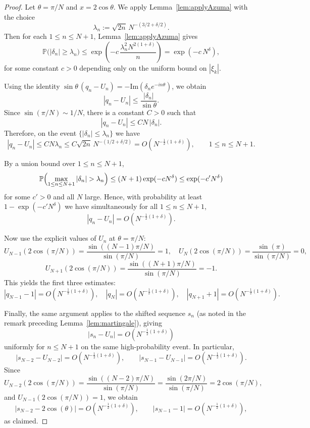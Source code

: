 \documentclass{amsart}
\theoremstyle{remark}
\theoremstyle{definition}
\begin{document}
\begin{proof}
Let $\theta=\pi/N$ and $x=2\cos\theta$.  We apply Lemma~\ref{lem:applyAzuma} with the choice
\[
\lambda_n := \sqrt{2n}\,N^{-(3/2+\delta/2)} .
\]
Then for each $1\le n\le N+1$, Lemma~\ref{lem:applyAzuma} gives
\[
\mathbb{P}\bigl(|\delta_n|\ge \lambda_n\bigr)
\le
\exp\!\left(-c\,\frac{\lambda_n^2 N^{2(1+\delta)}}{n}\right)
=
\exp\!\left(-c\,N^{\delta}\right),
\]
for some constant $c>0$ depending only on the uniform bound on $|\xi_k|$.

Using the identity $\sin\theta\,(q_n-U_n)=-\textrm{Im}(\delta_n e^{-in\theta})$, we obtain
\[
|q_n-U_n|\le \frac{|\delta_n|}{\sin\theta}.
\]
Since $\sin(\pi/N)\sim 1/N$, there is a constant $C>0$ such that
\[
|q_n-U_n|\le C N\,|\delta_n|.
\]
Therefore, on the event $\{|\delta_n|\le \lambda_n\}$ we have
\[
|q_n-U_n|\le C N \lambda_n
\le C \sqrt{2n}\,N^{-(1/2+\delta/2)}
=O\!\left(N^{-\frac12(1+\delta)}\right),
\qquad 1\le n\le N+1.
\]

By a union bound over $1\le n\le N+1$,
\[
\mathbb{P}\Bigl(\max_{1\le n\le N+1}|\delta_n|>\lambda_n\Bigr)
\le (N+1)\exp(-cN^\delta)
\le \exp(-c' N^\delta)
\]
for some $c'>0$ and all $N$ large. Hence, with probability at least
$1-\exp(-c' N^\delta)$ we have simultaneously for all $1\le n\le N+1$,
\[
|q_n-U_n| = O\!\left(N^{-\frac12(1+\delta)}\right).
\]

Now use the explicit values of $U_n$ at $\theta=\pi/N$:
\[
U_{N-1}(2\cos(\pi/N))=\frac{\sin((N-1)\pi/N)}{\sin(\pi/N)}=1,\quad
U_N(2\cos(\pi/N))=\frac{\sin(\pi)}{\sin(\pi/N)}=0,
\]
\[
U_{N+1}(2\cos(\pi/N))=\frac{\sin((N+1)\pi/N)}{\sin(\pi/N)}=-1.
\]
This yields the first three estimates:
\[
|q_{N-1}-1|=O\!\left(N^{-\frac12(1+\delta)}\right),\quad
|q_N|=O\!\left(N^{-\frac12(1+\delta)}\right),\quad
|q_{N+1}+1|=O\!\left(N^{-\frac12(1+\delta)}\right).
\]

Finally, the same argument applies to the shifted sequence $s_n$ (as noted in the remark preceding Lemma~\ref{lem:martingale}), giving
\[
|s_n-U_n|=O\!\left(N^{-\frac12(1+\delta)}\right)
\]
uniformly for $n\le N+1$ on the same high-probability event. In particular,
\[
|s_{N-2}-U_{N-2}|=O\!\left(N^{-\frac12(1+\delta)}\right),\qquad
|s_{N-1}-U_{N-1}|=O\!\left(N^{-\frac12(1+\delta)}\right).
\]
Since
\[
U_{N-2}(2\cos(\pi/N))
=\frac{\sin((N-2)\pi/N)}{\sin(\pi/N)}
=\frac{\sin(2\pi/N)}{\sin(\pi/N)}=2\cos(\pi/N),
\]
and $U_{N-1}(2\cos(\pi/N))=1$, we obtain
\[
|s_{N-2}-2\cos(\theta)|=O\!\left(N^{-\frac12(1+\delta)}\right),\qquad
|s_{N-1}-1|=O\!\left(N^{-\frac12(1+\delta)}\right),
\]
as claimed.
\end{proof}
\end{document}
